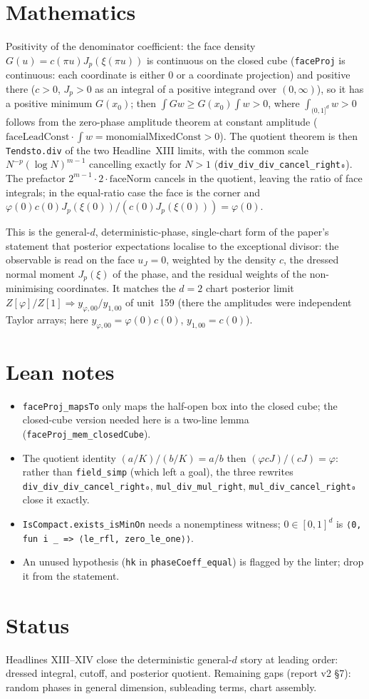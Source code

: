 \documentclass[11pt]{article}
\begin{document}
\section{Mathematics}
Positivity of the denominator coefficient: the face density $G(u)=c(\pi u)J_p(\xi(\pi u))$ is
continuous on the closed cube (\texttt{faceProj} is continuous: each coordinate is either $0$ or a
coordinate projection) and positive there ($c>0$, $J_p>0$ as an integral of a positive integrand
over $(0,\infty)$), so it has a positive minimum $G(x_0)$; then
$\int Gw\ge G(x_0)\int w>0$, where $\int_{(0,1]^d}w>0$ follows from the zero-phase amplitude theorem
at constant amplitude ($\mathrm{faceLeadConst}\cdot\int w=\mathrm{monomialMixedConst}>0$). The
quotient theorem is then \texttt{Tendsto.div} of the two Headline~XIII limits, with the common scale
$N^{-p}(\log N)^{m-1}$ cancelling exactly for $N>1$
(\texttt{div\_div\_div\_cancel\_right₀}). The prefactor $2^{m-1}\cdot2\cdot\mathrm{faceNorm}$ cancels
in the quotient, leaving the ratio of face integrals; in the equal-ratio case the face is the corner
and $\varphi(0)c(0)J_p(\xi(0))/(c(0)J_p(\xi(0)))=\varphi(0)$.

This is the general-$d$, deterministic-phase, single-chart form of the paper's statement that
posterior expectations localise to the exceptional divisor: the observable is read on the face
$u_J=0$, weighted by the density $c$, the dressed normal moment $J_p(\xi)$ of the phase, and the
residual weights of the non-minimising coordinates. It matches the $d=2$ chart posterior limit
$Z[\varphi]/Z[1]\Rightarrow y_{\varphi,00}/y_{1,00}$ of unit~159 (there the amplitudes were
independent Taylor arrays; here $y_{\varphi,00}=\varphi(0)c(0)$, $y_{1,00}=c(0)$).

\section{Lean notes}
\begin{itemize}
\item \texttt{faceProj\_mapsTo} only maps the half-open box into the closed cube; the closed-cube
  version needed here is a two-line lemma (\texttt{faceProj\_mem\_closedCube}).
\item The quotient identity $(a/K)/(b/K)=a/b$ then $(\varphi c J)/(cJ)=\varphi$: rather than
  \texttt{field\_simp} (which left a goal), the three rewrites
  \texttt{div\_div\_div\_cancel\_right₀}, \texttt{mul\_div\_mul\_right}, \texttt{mul\_div\_cancel\_right₀}
  close it exactly.
\item \texttt{IsCompact.exists\_isMinOn} needs a nonemptiness witness; $0\in[0,1]^d$ is
  \texttt{⟨0, fun i \_ => ⟨le\_rfl, zero\_le\_one⟩⟩}.
\item An unused hypothesis (\texttt{hk} in \texttt{phaseCoeff\_equal}) is flagged by the linter;
  drop it from the statement.
\end{itemize}

\section{Status}
Headlines XIII--XIV close the deterministic general-$d$ story at leading order: dressed integral,
cutoff, and posterior quotient. Remaining gaps (report v2 §7): random phases in general dimension,
subleading terms, chart assembly.
\end{document}
